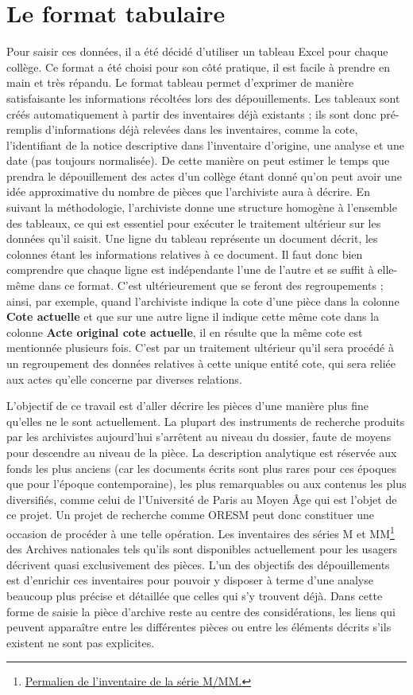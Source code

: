 \section{Le format tabulaire}
Pour saisir ces données, il a été décidé d'utiliser un tableau Excel pour chaque collège. Ce format a été choisi pour son côté pratique, il est facile à prendre en main et très répandu. Le format tableau permet d'exprimer de manière satisfaisante les informations récoltées lors des dépouillements. Les tableaux sont créés automatiquement à partir des inventaires déjà existants ; ils sont donc pré-remplis d'informations déjà relevées dans les inventaires, comme la cote, l'identifiant de la notice descriptive dans l'inventaire d'origine, une analyse et une date (pas toujours normalisée). De cette manière on peut estimer le temps que prendra le dépouillement des actes d'un collège étant donné qu'on peut avoir une idée approximative du nombre de pièces que l'archiviste aura à décrire. En suivant la méthodologie, l'archiviste donne une structure homogène à l'ensemble des tableaux, ce qui est essentiel pour exécuter le traitement ultérieur sur les données qu'il saisit. Une ligne du tableau représente un document décrit, les colonnes étant les informations relatives à ce document. Il faut donc bien comprendre que chaque ligne est indépendante l'une de l'autre et se suffit à elle-même dans ce format. C'est ultérieurement que se feront des regroupements ; ainsi, par exemple, quand l'archiviste indique la cote d'une pièce dans la colonne \textbf{Cote actuelle} et que sur une autre ligne il indique cette même cote dans la colonne \textbf{Acte original cote actuelle}, il en résulte que la même cote est mentionnée plusieurs fois. C'est par un traitement ultérieur qu'il sera procédé à un regroupement des données relatives à cette unique entité cote, qui sera reliée aux actes qu'elle concerne par diverses relations.
\par
L'objectif de ce travail est d'aller décrire les pièces d'une manière plus fine qu'elles ne le sont actuellement. La plupart des instruments de recherche produits par les archivistes aujourd'hui s'arrêtent au niveau du dossier, faute de moyens pour descendre au niveau de la pièce. La description analytique est réservée aux fonds les plus anciens (car les documents écrits sont plus rares pour ces époques que pour l'époque contemporaine), les plus remarquables ou aux contenus les plus diversifiés, comme celui de l'Université de Paris au Moyen Âge qui est l'objet de ce projet. Un projet de recherche comme ORESM peut donc constituer une occasion de procéder à une telle opération. Les inventaires des séries M et MM\footnote{\href{https://www.siv.archives-nationales.culture.gouv.fr/siv/IR/FRAN_IR_001382}{Permalien de l'inventaire de la série M/MM.}} des Archives nationales tels qu'ils sont disponibles actuellement pour les usagers décrivent quasi exclusivement des pièces. L'un des objectifs des dépouillements est d'enrichir ces inventaires pour pouvoir y disposer à terme d'une analyse beaucoup plus précise et détaillée que celles qui s'y trouvent déjà. Dans cette forme de saisie la pièce d'archive reste au centre des considérations, les liens qui peuvent apparaître entre les différentes pièces ou entre les éléments décrits s'ils existent ne sont pas explicites. 
